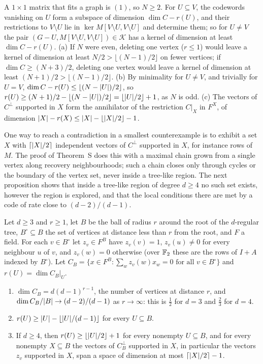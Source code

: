 \begin{informalproof}
A $1\times1$ matrix that fits a graph is $(1)$, so $N\ge2$. For $U\subseteq V$, the codewords vanishing on $U$ form a
subspace of dimension $\dim C-r(U)$, and their restrictions to $V\setminus U$ lie in $\ker M[V\setminus U,V\setminus U]$
and determine them; so for $U\ne V$ the pair $(G-U,M[V\setminus U,V\setminus U])\in\mathcal K$ has a kernel of dimension
at least $\dim C-r(U)$. (a) If $N$ were even, deleting one vertex ($r\le1$) would leave a kernel of dimension at least
$N/2>\lfloor(N-1)/2\rfloor$ on fewer vertices; if $\dim C\ge(N+3)/2$, deleting one vertex would leave a kernel of
dimension at least $(N+1)/2>\lfloor(N-1)/2\rfloor$. (b) By minimality for $U\ne V$, and trivially for $U=V$,
$\dim C-r(U)\le\lfloor(N-\lvert U \rvert)/2\rfloor$, so $r(U)\ge(N+1)/2-\lfloor(N-\lvert U \rvert)/2\rfloor=\lfloor\lvert U \rvert/2\rfloor+1$,
as $N$ is odd. (c) The vectors of $C^\perp$ supported in $X$ form the annihilator of the
restriction $C|_X$ in $F^X$, of dimension $\lvert X \rvert-r(X)\le\lvert X \rvert-\lfloor\lvert X \rvert/2\rfloor-1$.
\end{informalproof}

One way to reach a contradiction in a smallest counterexample is to exhibit a set $X$ with $\lceil\lvert X \rvert/2\rceil$
independent vectors of $C^\perp$ supported in $X$, for instance rows of $M$. The proof of Theorem~S does this with a
maximal chain grown from a single vertex along recovery neighbourhoods; such a chain closes only through cycles or the
boundary of the vertex set, never inside a tree-like region. The next proposition shows that inside a tree-like region of degree
$d\ge4$ no such set exists, however the region is explored, and that the local conditions there are met by a code of
rate close to $(d-2)/(d-1)$.

\begin{proposition}\label{prop:L}
\notformalized
Let $d\ge3$ and $r\ge1$, let $B$ be the ball of radius $r$ around the root of the $d$-regular tree, $B^\circ\subseteq B$
the set of vertices at distance less than $r$ from the root, and $F$ a field. For each $v\in B^\circ$ let $z_v\in F^B$
have $z_v(v)=1$, $z_v(u)\ne0$ for every neighbour $u$ of $v$, and $z_v(w)=0$ otherwise (over $\mathbb{F}_2$ these are the rows
of $I+A$ indexed by $B^\circ$). Let $C_B=\{x\in F^B:\sum_wz_v(w)x_w=0\text{ for all }v\in B^\circ\}$ and
$r(U)=\dim C_B|_U$.
\begin{enumerate}[label=(\roman*)]
\item $\dim C_B=d(d-1)^{r-1}$, the number of vertices at distance $r$, and $\dim C_B/\lvert B \rvert\to(d-2)/(d-1)$ as
  $r\to\infty$: this is $\frac12$ for $d=3$ and $\frac23$ for $d=4$.
\item $r(U)\ge\lvert U \rvert-\lfloor\lvert U \rvert/(d-1)\rfloor$ for every $U\subseteq B$.
\item If $d\ge4$, then $r(U)\ge\lfloor\lvert U \rvert/2\rfloor+1$ for every nonempty $U\subseteq B$, and for every nonempty
  $X\subseteq B$ the vectors of $C_B^\perp$ supported in $X$, in particular the vectors $z_v$ supported in $X$, span a
  space of dimension at most $\lceil\lvert X \rvert/2\rceil-1$.
\end{enumerate}
\end{proposition}

